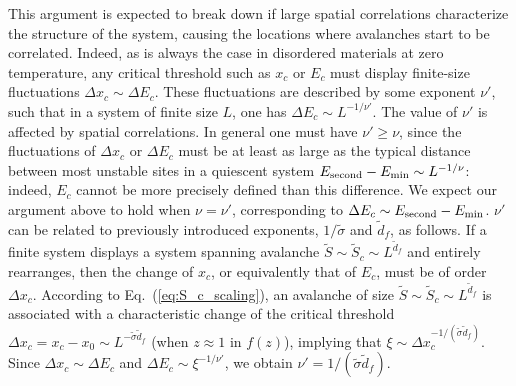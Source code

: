 \documentclass[pre,twocolumn,superscriptaddress,tightenlines,showpacs,longbibliography,floatfix,footinbib]{revtex4-1}
\newcommand{\mw}[1]{\textcolor{blue}{#1}}
\begin{document}

This argument is expected to break down if large spatial correlations characterize the structure of the system, causing the locations where avalanches start to be correlated. Indeed, as is always the case in disordered materials at zero temperature, any critical threshold such as $x_c$ or $E_c$ must display finite-size fluctuations $\Delta x_c\sim \Delta E_c$. These fluctuations are described by some exponent $\nu'$, such that in a  system of finite size $L$, one has $\Delta E_c\sim L^{-1/\nu'}$. %
The value of $\nu'$ is affected by  spatial correlations. In general one must have $\nu'\geq \nu$, since the fluctuations of $\Delta x_c$ or $\Delta E_c$ must be at least as large as the typical distance between most unstable sites in  a quiescent system $ E_{\rm second} - E_{\rm min}\sim L^{-1/\nu}$: indeed, $E_c$ cannot be more precisely defined than this difference. We expect our argument above to hold when $\nu=\nu'$, corresponding to $\Delta E_c\sim E_{\rm second} - E_{\rm min}$.
$\nu'$ can be related to previously introduced exponents, $1/\tilde \sigma$ and $\tilde d_f$, as follows. If a finite system displays a system spanning avalanche $\tilde S \sim \tilde S_c \sim L^{\tilde d_f}$ and entirely rearranges, then the change of $x_c$, or equivalently that of $E_c$, must be of order $\Delta x_c$. According to Eq.~(\ref{eq:S_c_scaling}), an avalanche of size $\tilde S \sim \tilde S_c \sim L^{\tilde d_f}$ is associated with a characteristic change of the critical threshold $\Delta x_c = x_c - x_0 \sim L^{-\tilde \sigma \tilde d_f}$ (when $z \approx 1$ in $f(z)$), implying that $\xi \sim \Delta x_c^{-1/(\tilde \sigma \tilde d_f)}$. Since $\Delta x_c \sim \Delta E_c$ and $\Delta E_c \sim \xi^{-1/\nu'}$, we obtain $\nu'=1/(\tilde \sigma \tilde d_f)$. %
\end{document}
